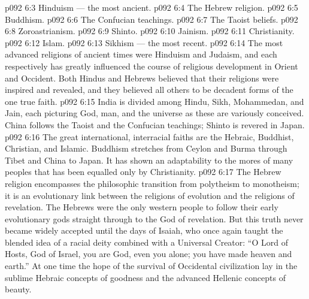 \vs p092 6:3 \bibnobreakspace Hinduism --- the most ancient.
\vs p092 6:4 \bibnobreakspace The Hebrew religion.
\vs p092 6:5 \bibnobreakspace Buddhism.
\vs p092 6:6 \bibnobreakspace The Confucian teachings.
\vs p092 6:7 \bibnobreakspace The Taoist beliefs.
\vs p092 6:8 \bibnobreakspace Zoroastrianism.
\vs p092 6:9 \bibnobreakspace Shinto.
\vs p092 6:10 \bibnobreakspace Jainism.
\vs p092 6:11 \bibnobreakspace Christianity.
\vs p092 6:12 \bibnobreakspace Islam.
\vs p092 6:13 \bibnobreakspace Sikhism --- the most recent.
\vs p092 6:14 \pc The most advanced religions of ancient times were Hinduism and Judaism, and each respectively has greatly influenced the course of religious development in Orient and Occident. Both Hindus and Hebrews believed that their religions were inspired and revealed, and they believed all others to be decadent forms of the one true faith.
\vs p092 6:15 India is divided among Hindu, Sikh, Mohammedan, and Jain, each picturing God, man, and the universe as these are variously conceived. China follows the Taoist and the Confucian teachings; Shinto is revered in Japan.
\vs p092 6:16 The great international, interracial faiths are the Hebraic, Buddhist, Christian, and Islamic. Buddhism stretches from Ceylon and Burma through Tibet and China to Japan. It has shown an adaptability to the mores of many peoples that has been equalled only by Christianity.
\vs p092 6:17 The Hebrew religion encompasses the philosophic transition from polytheism to monotheism; it is an evolutionary link between the religions of evolution and the religions of revelation. The Hebrews were the only western people to follow their early evolutionary gods straight through to the God of revelation. But this truth never became widely accepted until the days of Isaiah, who once again taught the blended idea of a racial deity combined with a Universal Creator: “O Lord of Hosts, God of Israel, you are God, even you alone; you have made heaven and earth.” At one time the hope of the survival of Occidental civilization lay in the sublime Hebraic concepts of goodness and the advanced Hellenic concepts of beauty.
